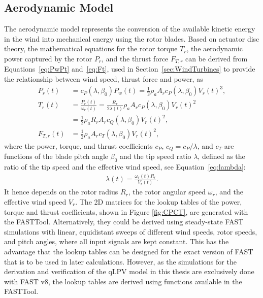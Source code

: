\subsection{Aerodynamic Model}
The aerodynamic model represents the conversion of the available kinetic energy in the wind into mechanical energy using the rotor blades. Based on actuator disc theory, the mathematical equations for the rotor torque $T_{r}$, the aerodynamic power captured by the rotor $P_{r}$, and the thrust force $F_{T,r}$ can be derived from Equations~\eqref{eq:PwPt} and~\eqref{eq:Ft}, used in Section~\ref{sec:WindTurbines} to provide the relationship between wind speed, thrust force and power, as
\begin{equation}\label{eq:aero}
    \begin{split}
        P_{r}(t) & = c_P(\lambda,\beta_0) P_{w}(t) = \frac{1}{2} \rho_a A_r c_P(\lambda,\beta_0) V_r(t)^3, \\
        T_{r}(t) & = \frac{P_{r}(t)}{\omega_{r}(t)} %
        = \frac{R_r}{2\lambda(t)} \rho_a A_r  c_P(\lambda,\beta_0) V_r(t)^{2} \\
        & =  \frac{1}{2} \rho_a R_r A_r  c_Q(\lambda,\beta_0) V_r(t)^{2} ,\\
        F_{T,r}(t) & = \frac{1}{2} \rho_a A_r  c_{T}(\lambda,\beta_0) V_r(t)^{2},
    \end{split}
\end{equation}
where the power, torque, and thrust coefficients $c_P$, $c_Q = c_P/\lambda$, and $c_{T}$ are functions of the blade pitch angle $\beta_0$ and the tip speed ratio $\lambda$, defined as the ratio of the tip speed and the effective wind speed, see Equation~\eqref{eq:lambda}:
\begin{align*}
    \lambda(t) = \frac{\omega_{r}(t) R_r}{V_r(t)}.
\end{align*}
It hence depends on the rotor radius $R_r$, the rotor angular speed $\omega_{r}$, and the effective wind speed $V_r$. The 2D matrices for the lookup tables of the power, torque and thrust coefficients, shown in Figure \ref{fig:CPCT}, are generated with the FASTTool.  Alternatively, they could be derived using steady-state FAST simulations with linear, equidistant sweeps of different wind speeds, rotor speeds, and pitch angles, where all input signals are kept constant. This has the advantage that the lookup tables can be designed for the exact version of FAST that is to be used in later calculations. However, as the simulations for the derivation and verification of the qLPV model in this thesis are exclusively done with FAST v8, the lookup tables are derived using functions available in the FASTTool.

